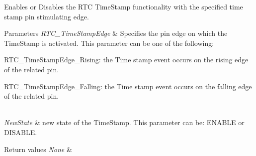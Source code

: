 Enables or Disables the R\+T\+C Time\+Stamp functionality with the specified time stamp pin stimulating edge. 


\begin{DoxyParams}{Parameters}
{\em R\+T\+C\+\_\+\+Time\+Stamp\+Edge} & Specifies the pin edge on which the Time\+Stamp is activated. This parameter can be one of the following\+: \begin{DoxyItemize}
\item R\+T\+C\+\_\+\+Time\+Stamp\+Edge\+\_\+\+Rising\+: the Time stamp event occurs on the rising edge of the related pin. \item R\+T\+C\+\_\+\+Time\+Stamp\+Edge\+\_\+\+Falling\+: the Time stamp event occurs on the falling edge of the related pin. \end{DoxyItemize}
\\
\hline
{\em New\+State} & new state of the Time\+Stamp. This parameter can be\+: E\+N\+A\+B\+L\+E or D\+I\+S\+A\+B\+L\+E. \\
\hline
\end{DoxyParams}

\begin{DoxyRetVals}{Return values}
{\em None} & \\
\hline
\end{DoxyRetVals}
